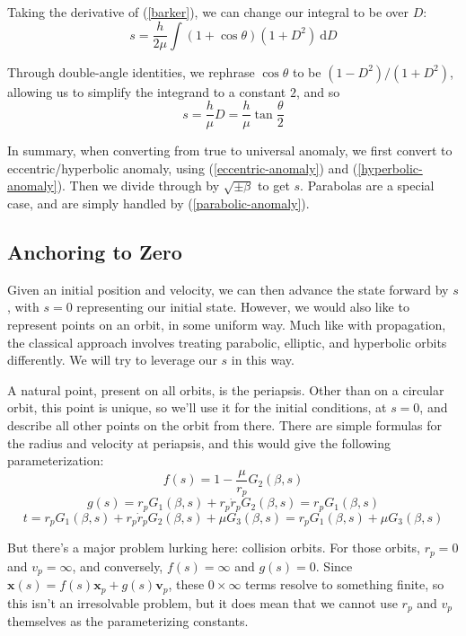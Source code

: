 \documentclass{article}
\newcommand{\dd}{\mathrm{d}}
\numberwithin{equation}{subsection}
\begin{document}
Taking the derivative of (\ref{barker}), we can change our integral to be over $D$:
\begin{equation}
s = \frac{h}{2 \mu} \int (1 + \cos \theta)(1 + D^2)~\dd D
\end{equation}

Through double-angle identities, we rephrase $\cos \theta$ to be $(1 - D^2)/(1 + D^2)$, allowing us to simplify the integrand to a constant $2$, and so
\begin{equation}
\label{parabolic-anomaly}
s = \frac{h}{\mu} D = \frac{h}{\mu} \tan \frac{\theta}{2}
\end{equation}

In summary, when converting from true to universal anomaly, we first convert to eccentric/hyperbolic anomaly, using (\ref{eccentric-anomaly}) and (\ref{hyperbolic-anomaly}). Then we divide through by $\sqrt{\pm \beta}$ to get $s$. Parabolas are a special case, and are simply handled by (\ref{parabolic-anomaly}).

\subsection*{Anchoring to Zero}

Given an initial position and velocity, we can then advance the state forward by $s$, with $s = 0$ representing our initial state. However, we would also like to represent points on an orbit, in some uniform way. Much like with propagation, the classical approach involves treating parabolic, elliptic, and hyperbolic orbits differently. We will try to leverage our $s$ in this way.

A natural point, present on all orbits, is the periapsis. Other than on a circular orbit, this point is unique, so we'll use it for the initial conditions, at $s = 0$, and describe all other points on the orbit from there. There are simple formulas for the radius and velocity at periapsis, and this would give the following parameterization:
\[ f(s) = 1 - \frac{\mu}{r_p} G_2(\beta, s) \]
\[ g(s) = r_p G_1(\beta, s) + r_p \dot r_p G_2(\beta, s) = r_p G_1(\beta, s) \]
\[ t = r_p G_1(\beta, s) + r_p \dot{r}_p G_2(\beta, s) + \mu G_3(\beta, s) = r_p G_1(\beta, s) + \mu G_3(\beta, s) \]

But there's a major problem lurking here: collision orbits. For those orbits, $r_p = 0$ and $v_p = \infty$, and conversely, $f(s) = \infty$ and $g(s) = 0$. Since $\bm x(s) = f(s) \bm x_p + g(s) \bm v_p$, these $0 \times \infty$ terms resolve to something finite, so this isn't an irresolvable problem, but it does mean that we cannot use $r_p$ and $v_p$ themselves as the parameterizing constants.
\end{document}
